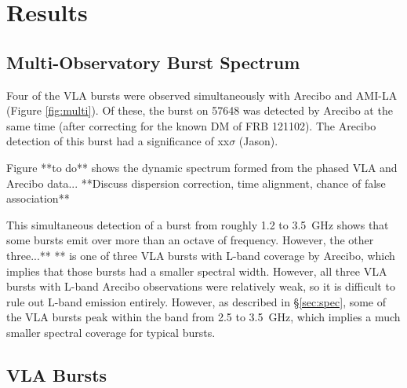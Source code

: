 \documentclass[twocolumn]{aastex61}
\newcommand{\frb}{FRB 121102}
\begin{document}
\section{Results}

\subsection{Multi-Observatory Burst Spectrum}
Four of the VLA bursts were observed simultaneously with Arecibo and AMI-LA (Figure \ref{fig:multi}). Of these, the burst on 57648 was detected by Arecibo at the same time (after correcting for the known DM of \frb). The Arecibo detection of this burst had a significance of {\color{red} xx$\sigma$ (Jason)}.

Figure {\color{red} **to do**} shows the dynamic spectrum formed from the phased VLA and Arecibo data... **Discuss dispersion correction, time alignment, chance of false association** 

This simultaneous detection of a burst from roughly 1.2 to 3.5~GHz shows that some bursts emit over more than an octave of frequency. However, the other three...**
**
 is one of three VLA bursts with L-band coverage by Arecibo, which implies that those bursts had a smaller spectral width. However, all three VLA bursts with L-band Arecibo observations were relatively weak, so it is difficult to rule out L-band emission entirely. However, as described in \S \ref{sec:spec}, some of the VLA bursts peak within the band from 2.5 to 3.5~GHz, which implies a much smaller spectral coverage for typical bursts.

\subsection{VLA Bursts}
\end{document}
